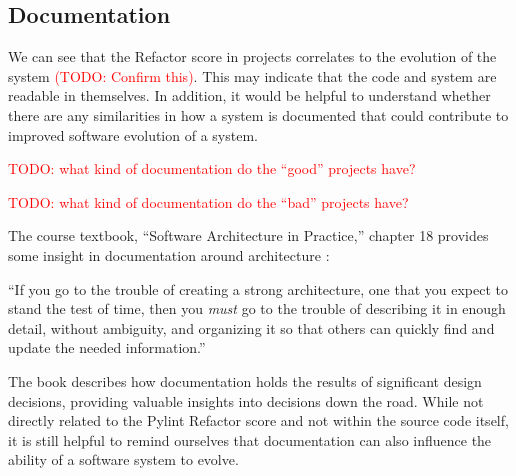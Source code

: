 \documentclass[12pt,conference]{IEEEtran}
\newcommand\todo[1]{\textcolor{red}{#1}}
\begin{document}
\subsection{Documentation} \label{sectionDocumentation}


We can see that the Refactor score in projects correlates to the evolution of the system \todo{(TODO: Confirm this)}. This may indicate that the code and system are readable in themselves. In addition, it would be helpful to understand whether there are any similarities in how a system is documented that could contribute to improved software evolution of a system.

\todo{TODO: what kind of documentation do the ``good'' projects have?}

\todo{TODO: what kind of documentation do the ``bad'' projects have?}


The course textbook, ``Software Architecture in Practice,'' chapter 18 provides some insight in documentation around architecture \cite{book:software-architecture-in-practice}:

\vspace{0.25cm}

\begin{displayquote}
``If you go to the trouble of creating a strong architecture, one that you expect to stand the test of time, then you \textit{must} go to the trouble of describing it in enough detail, without ambiguity, and organizing it so that others can quickly find and update the needed information.''
\end{displayquote}

\vspace{0.25cm}

The book describes how documentation holds the results of significant design decisions, providing valuable insights into decisions down the road. While not directly related to the Pylint Refactor score and not within the source code itself, it is still helpful to remind ourselves that documentation can also influence the ability of a software system to evolve.
\end{document}
